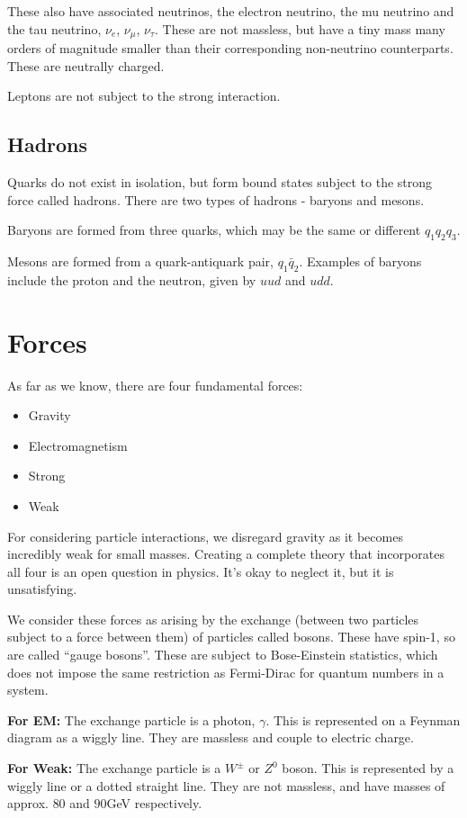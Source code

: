These also have associated neutrinos, the electron neutrino, the mu neutrino and the tau neutrino, $\nu_e$, $\nu_\mu$, $\nu_\tau$. These are not massless, but have a tiny mass many orders of magnitude smaller than their corresponding non-neutrino counterparts. These are neutrally charged.

Leptons are not subject to the strong interaction.

\subsection{Hadrons}
Quarks do not exist in isolation, but form bound states subject to the strong force called hadrons. There are two types of hadrons - baryons and mesons.

Baryons are formed from three quarks, which may be the same or different $q_1 q_2 q_3$.

Mesons are formed from a quark-antiquark pair, $q_1 \bar{q}_2$. Examples of baryons include the proton and the neutron, given by $uud$ and $udd$.

\section{Forces}
As far as we know, there are four fundamental forces:
\begin{itemize}
    \item Gravity
    \item Electromagnetism
    \item Strong 
    \item Weak
\end{itemize}

For considering particle interactions, we disregard gravity as it becomes incredibly weak for small masses. Creating a complete theory that incorporates all four is an open question in physics. It's okay to neglect it, but it is unsatisfying.

We consider these forces as arising by the exchange (between two particles subject to a force between them) of particles called bosons. These have spin-1, so are called ``gauge bosons''. These are subject to Bose-Einstein statistics, which does not impose the same restriction as Fermi-Dirac for quantum numbers in a system.

\textbf{For EM: } The exchange particle is a photon, $\gamma$. This is represented on a Feynman diagram as a wiggly line. They are massless and couple to electric charge.

\textbf{For Weak: } The exchange particle is a $W^\pm$ or $Z^0$ boson. This is represented by a wiggly line or a dotted straight line. They are not massless, and have masses of approx. $80$ and $90$GeV respectively.

